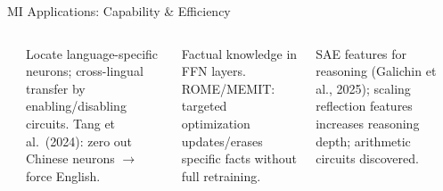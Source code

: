 \begin{frame}{MI Applications: Capability \& Efficiency }
  \begin{columns}[T]
    {\small\bfseries{}}

    \begin{tcolorbox}[enhanced, colback=UCRlgray, colframe=UCRmgray,
        borderline west={3pt}{0pt}{UCRnavy}, sharp corners,
        fonttitle=\bfseries\footnotesize\color{UCRnavy},
        title=Multilingualism, top=3pt, bottom=3pt]
      \scriptsize Locate language-specific neurons; cross-lingual transfer by
      enabling/disabling circuits. Tang et al.\ (2024): zero out Chinese neurons $\to$ force English.
    \end{tcolorbox}\vspace{2pt}
    \begin{tcolorbox}[enhanced, colback=UCRlgray, colframe=UCRmgray,
        borderline west={3pt}{0pt}{UCRnavy}, sharp corners,
        fonttitle=\bfseries\footnotesize\color{UCRnavy},
        title=Knowledge Editing, top=3pt, bottom=3pt]
      \scriptsize Factual knowledge in FFN layers. ROME/MEMIT: targeted
      optimization updates/erases specific facts without full retraining.
    \end{tcolorbox}\vspace{2pt}
    \begin{tcolorbox}[enhanced, colback=UCRlgray, colframe=UCRmgray,
        borderline west={3pt}{0pt}{UCRnavy}, sharp corners,
        fonttitle=\bfseries\footnotesize\color{UCRnavy},
        title=Logic \& Reasoning, top=3pt, bottom=3pt]
      \scriptsize SAE features for reasoning (Galichin et al., 2025); scaling
      reflection features increases reasoning depth; arithmetic circuits discovered.
    \end{tcolorbox}

    {\small\bfseries{}}


\end{columns}
\end{frame}
